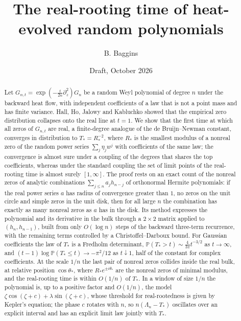 \documentclass[11pt]{amsart}
\title[The real-rooting time of heat-evolved random polynomials]{The real-rooting time of heat-evolved random polynomials}
\author{B. Baggins}
\date{Draft, October 2026}
\theoremstyle{definition}
\theoremstyle{remark}
\numberwithin{equation}{section}
\newcommand{\PP}{\mathbb{P}}
\begin{document}
\begin{abstract}
Let $G_{n,t}=\exp(-\frac{t}{2n}\partial_z^2)G_n$ be a random Weyl polynomial of degree $n$ under the backward heat flow, with independent coefficients of a law that is not a point mass and has finite variance. Hall, Ho, Jalowy and Kabluchko showed that the empirical zero distribution collapses onto the real line at $t=1$. We show that the first time at which all zeros of $G_{n,t}$ are real, a finite-degree analogue of the de Bruijn--Newman constant, converges in distribution to $T_*=R_*^{-2}$, where $R_*$ is the smallest modulus of a nonreal zero of the random power series $\sum_j\eta_jw^j$ with coefficients of the same law; the convergence is almost sure under a coupling of the degrees that shares the top coefficients, whereas under the standard coupling the set of limit points of the real-rooting time is almost surely $[1,\infty]$. The proof rests on an exact count of the nonreal zeros of analytic combinations $\sum_{j\le n}a_jh_{n-j}$ of orthonormal Hermite polynomials: if the real power series $a$ has radius of convergence greater than $1$, no zeros on the unit circle and simple zeros in the unit disk, then for all large $n$ the combination has exactly as many nonreal zeros as $a$ has in the disk. Its method expresses the polynomial and its derivative in the bulk through a $2\times2$ matrix applied to $(h_n,h_{n-1})$, built from only $O(\log n)$ steps of the backward three-term recurrence, with the remaining terms controlled by a Christoffel--Darboux bound. For Gaussian coefficients the law of $T_*$ is a Fredholm determinant, $\PP(T_*>t)\sim\frac4{3\pi}t^{-3/2}$ as $t\to\infty$, and $(t-1)\log\PP(T_*\le t)\to-\pi^2/12$ as $t\downarrow1$, half of the constant for complex coefficients. At the scale $1/n$ the last pair of nonreal zeros collides inside the real bulk, at relative position $\cos\theta_*$, where $R_*e^{\pm i\theta_*}$ are the nonreal zeros of minimal modulus, and the real-rooting time is within $O(1/n)$ of $T_*$. In a window of size $1/n$ the polynomial is, up to a positive factor and $O(1/n)$, the model $\zeta\cos(\zeta+c)+\lambda\sin(\zeta+c)$, whose threshold for real-rootedness is given by Kepler's equation; the phase $c$ rotates with $n$, so $n(\Lambda_n-T_*)$ oscillates over an explicit interval and has an explicit limit law jointly with $T_*$.
\end{abstract}

\maketitle
\end{document}
